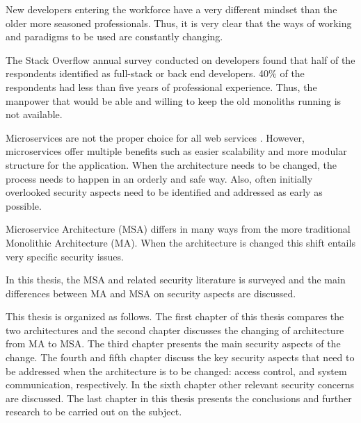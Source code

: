 \begin{sloppypar}
    New developers entering the workforce have a very different mindset than the
    older more seasoned professionals. Thus, it is very clear that the ways of
    working and paradigms to be used are constantly changing. 
\end{sloppypar}
\begin{sloppypar}
    The Stack Overflow annual survey \citep{sosurvey2019} conducted on
    developers found that half of the respondents identified as full-stack or
    back end developers. 40\% of the respondents had less than five years of
    professional experience. Thus, the manpower that would be able and willing
    to keep the old monoliths running is not available.
\end{sloppypar}
\begin{sloppypar}
    Microservices are not the proper choice for all web services
    \citep{newman2019}. However, microservices offer multiple benefits such as
    easier scalability and more modular structure for the application. When the
    architecture needs to be changed, the process needs to happen in an orderly
    and safe way. Also, often initially overlooked security aspects need to be
    identified and addressed as early as possible.
\end{sloppypar}
\begin{sloppypar}
    Microservice Architecture (MSA) differs in many ways from the more
    traditional Monolithic Architecture (MA). When the architecture is changed
    this shift entails very specific security issues.
\end{sloppypar}
\begin{sloppypar}
    In this thesis, the MSA and related security literature is surveyed and the
    main differences between MA and MSA on security aspects are discussed.
\end{sloppypar}
\begin{sloppypar}
    This thesis is organized as follows. The first chapter of this thesis
    compares the two architectures and the second chapter discusses the changing
    of architecture from MA to MSA. The third chapter presents the main security
    aspects of the change. The fourth and fifth chapter discuss the key security
    aspects that need to be addressed when the architecture is to be changed:
    access control, and system communication, respectively. In the sixth chapter
    other relevant security concerns are discussed. The last chapter in this
    thesis presents the conclusions and further research to be carried out on
    the subject.
\end{sloppypar}


